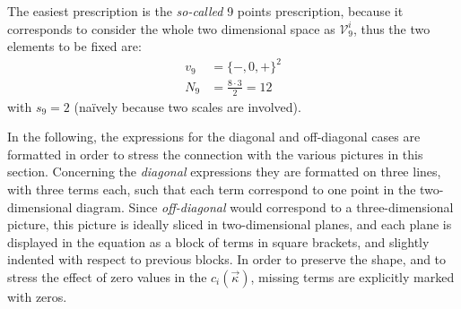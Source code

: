 The easiest prescription is the \textit{so-called} 9 points prescription,
because it corresponds to consider the whole two dimensional space as
$\mathcal{V}_9^i$, thus the two elements to be fixed are:
\begin{align}
    \label{eq:9specs}
    v_9 &= \{-, 0, +\}^2\\
    N_9 &= \frac{8 \cdot 3}{2} = 12
\end{align}
with $s_9 = 2$ (na\"ively because two scales are involved).

In the following, the expressions for the diagonal and off-diagonal cases are
formatted in order to stress the connection with the various pictures in this
section.
Concerning the \textit{diagonal} expressions they are formatted on three lines,
with three terms each, such that each term correspond to one point in the
two-dimensional diagram.
Since \textit{off-diagonal} would correspond to a three-dimensional picture,
this picture is ideally sliced in two-dimensional planes, and each plane is
displayed in the equation as a block of terms in square brackets, and slightly
indented with respect to previous blocks.
In order to preserve the shape, and to stress the effect of zero values in the
$c_i(\vec{\kappa})$, missing terms are explicitly marked with zeros.

